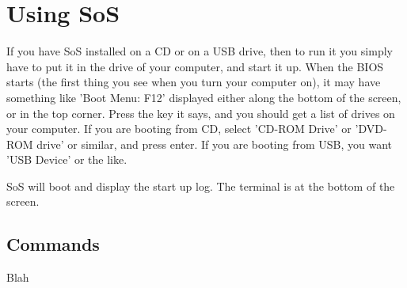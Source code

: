 \chapter{Using SoS}

If you have SoS installed on a CD or on a USB drive, then to run it you simply have to put it in the drive of 
your computer, and start it up. When the BIOS starts (the first thing you see when you turn your computer on),
it may have something like 'Boot Menu: F12' displayed either along the bottom of the screen, or in the top
corner. Press the key it says, and you should get a list of drives on your computer. If you are booting from
CD, select 'CD-ROM Drive' or 'DVD-ROM drive' or similar, and press enter. If you are booting from USB, you want
'USB Device' or the like.

SoS will boot and display the start up log. The terminal is at the bottom of the screen.

\section{Commands}
Blah

